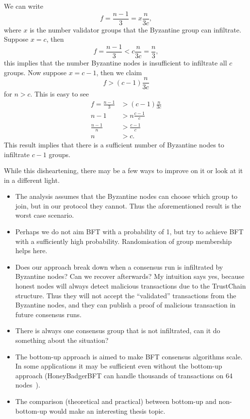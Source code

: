 We can write
$$
f = \frac{n-1}{3} = x \frac{n}{3c},
$$
where $x$ is the number validator groups that the Byzantine group can
infiltrate. Suppose $x = c$, then
$$f = \frac{n-1}{3} < c \frac{n}{3c} = \frac{n}{3},$$
this implies that the number Byzantine nodes is insufficient to infiltrate all
$c$ groups. Now suppose $x = c - 1$, then we claim
$$f > (c-1) \frac{n}{3c}$$
for $n > c$. This is easy to see
\begin{align*}
  f = \frac{n-1}{3} &> (c-1)\frac{n}{3c} \\
  n - 1 &> n\frac{c-1}{c} \\
  \frac{n-1}{n} &> \frac{c-1}{c} \\
  n &> c.
\end{align*}
This result implies that there is a sufficient number of Byzantine nodes to
infiltrate $c - 1$ groups.

While this disheartening, there may be a few ways to improve on it or look at it
in a different light.
\begin{itemize}
\item The analysis assumes that the Byzantine nodes can choose which group to
  join, but in our protocol they cannot. Thus the aforementioned result is the
  worst case scenario.
\item Perhaps we do not aim BFT with a probability of 1, but try to achieve BFT
  with a sufficiently high probability. Randomisation of group membership helps
  here.
\item Does our approach break down when a consensus run is infiltrated by
  Byzantine nodes? Can we recover afterwards? My intuition says yes, because
  honest nodes will always detect malicious transactions due to the TrustChain
  structure. Thus they will not accept the ``validated'' transactions from the
  Byzantine nodes, and they can publish a proof of malicious transaction in
  future consensus runs.
\item There is always one consensus group that is not infiltrated, can it do
  something about the situation?
\item The bottom-up approach is aimed to make BFT consensus algorithms scale. In
  some applications it may be sufficient even without the bottom-up approach
  (HoneyBadgerBFT can handle thousands of transactions on 64
  nodes~\cite{miller2016honey}).
\item The comparison (theoretical and practical) between bottom-up and
  non-bottom-up would make an interesting thesis topic.
\end{itemize}

